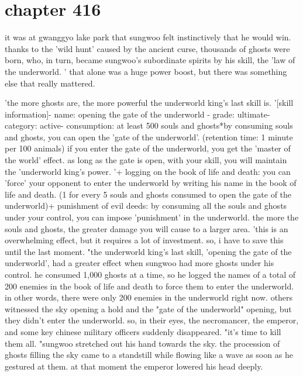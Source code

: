 \section{chapter 416}

it was at gwanggyo lake park that sungwoo felt instinctively that he would win.
 thanks to the 'wild hunt' caused by the ancient curse, thousands of ghosts were born, who, in turn, became sungwoo's subordinate spirits by his skill, the 'law of the underworld.
' that alone was a huge power boost, but there was something else that really mattered.





'the more ghosts are, the more powerful the underworld king's last skill is.
'[skill information]- name: opening the gate of the underworld - grade: ultimate- category: active- consumption: at least 500 souls and ghosts*by consuming souls and ghosts, you can open the 'gate of the underworld'.
 (retention time: 1 minute per 100 animals) if you enter the gate of the underworld, you get the 'master of the world' effect.
 as long as the gate is open, with your skill, you will maintain the 'underworld king's power.
'+ logging on the book of life and death: you can 'force' your opponent to enter the underworld by writing his name in the book of life and death.
 (1 for every 5 souls and ghosts consumed to open the gate of the underworld)+ punishment of evil deeds: by consuming all the souls and ghosts under your control, you can impose 'punishment' in the underworld.
 the more the souls and ghosts, the greater damage you will cause to a larger area.
'this is an overwhelming effect, but it requires a lot of investment.
 so, i have to save this until the last moment.
"the underworld king's last skill, 'opening the gate of the underworld', had a greater effect when sungwoo had more ghosts under his control.
 he consumed 1,000 ghosts at a time, so he logged the names of a total of 200 enemies in the book of life and death to force them to enter the underworld.
 in other words, there were only 200 enemies in the underworld right now.
others witnessed the sky opening a hold and the "gate of the underworld" opening, but they didn't enter the underworld.
 so, in their eyes, the necromancer, the emperor, and some key chinese military officers suddenly disappeared.
"it's time to kill them all.
"sungwoo stretched out his hand towards the sky.
 the procession of ghosts filling the sky came to a standstill while flowing like a wave as soon as he gestured at them.
at that moment the emperor lowered his head deeply.

